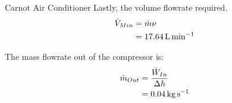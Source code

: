 \begin{example}{Carnot Air Conditioner}
  Lastly, the volume flowrate required.
  \begin{align*}
    \dot{V}_{Min} &= \dot{m} \nu \\
                             &= \SI{17.64}{\liter\per\minute}
  \end{align*}

  The mass flowrate out of the compressor is:
  \begin{align*}
    \dot{m}_{Out} &= \frac{\dot{W}_{In}}{\Delta h} \\
                           &= \SI{0.04}{\kilo\gram\per\second}
  \end{align*}
\end{example}

